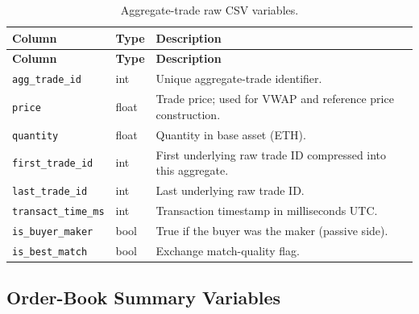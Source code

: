 \documentclass[11pt,a4paper]{article}
\begin{document}
\begin{longtable}{L{4.2cm}L{2.4cm}L{8.0cm}}
\caption{Aggregate-trade raw CSV variables.}\\
\toprule
\textbf{Column} & \textbf{Type} & \textbf{Description} \\
\midrule
\endfirsthead
\toprule
\textbf{Column} & \textbf{Type} & \textbf{Description} \\
\midrule
\endhead
\bottomrule
\endfoot
\texttt{agg\_trade\_id} & int & Unique aggregate-trade identifier. \\
\texttt{price} & float & Trade price; used for VWAP and reference price construction. \\
\texttt{quantity} & float & Quantity in base asset (ETH). \\
\texttt{first\_trade\_id} & int & First underlying raw trade ID compressed into this aggregate. \\
\texttt{last\_trade\_id} & int & Last underlying raw trade ID. \\
\texttt{transact\_time\_ms} & int & Transaction timestamp in milliseconds UTC. \\
\texttt{is\_buyer\_maker} & bool & True if the buyer was the maker (passive side). \\
\texttt{is\_best\_match} & bool & Exchange match-quality flag. \\
\end{longtable}

\subsection{Order-Book Summary Variables}
\end{document}
